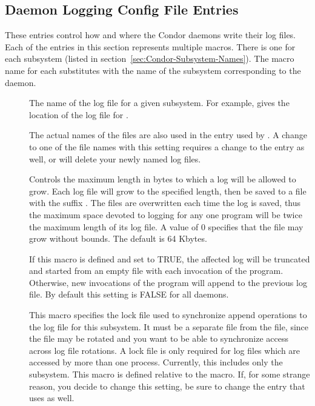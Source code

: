 \subsection{\label{sec:Daemon-Logging-Config-File-Entries}
Daemon Logging Config File Entries}

These entries control how and where the Condor daemons write their log
files.  Each of the entries in this section represents multiple
macros. There is one for each subsystem (listed
in section~\ref{sec:Condor-Subsystem-Names}).
The macro name for each substitutes  with the name
of the subsystem corresponding to the daemon.
\begin{description}
 
\item[] \label{param:SubsysLog} The name of
  the log file for a given subsystem.  For example,
   gives the location of the log file for
  .

  The actual names of the files
  are also used in the  entry used by
  .  A change to one of the
  file names with this setting requires a change to the
   entry as well, or  will
  delete your newly named log files.

\item[] \label{param:MaxSubsysLog} Controls
  the maximum length in bytes to which a
  log will be allowed to grow.  Each log file will grow to the
  specified length, then be saved to a file with the suffix
  .  The 
  files are overwritten each time the log is saved, thus the maximum
  space devoted to logging for any one program will be twice the
  maximum length of its log file.  A value of 0 specifies that the
  file may grow without bounds.  The default is 64 Kbytes.

\item[]
  \label{param:TruncSubsysLogOnOpen}  If this macro is defined and set
  to TRUE, the affected log will be truncated and started from an
  empty file with each invocation of the program.  Otherwise, new
  invocations of the program will append to the previous log
  file.  By default this setting is FALSE for all daemons. 

\item[] \label{param:SubsysLock} This macro
  specifies the lock file used to synchronize append operations to the
  log file for this subsystem.  It must be a separate file from the
   file, since the  file may be
  rotated and you want to be able to synchronize access across log
  file rotations.  A lock file is only required for log files which
  are accessed by more than one process.  Currently, this includes
  only the  subsystem.  This macro is defined relative
  to the  macro.  If, for some strange
  reason, you decide to change this setting, be sure to change the
   entry that  uses as well.


\end{description}
